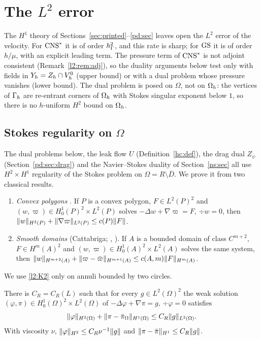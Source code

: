 \section{The \texorpdfstring{$L^2$}{L2} error}\label{l2:sec}

The $H^1$ theory of Sections~\ref{sec:printed}--\ref{pd:sec} leaves open the $L^2$ error of the velocity. For $\mathrm{CNS}^\ast$ it is of order $h_\Gamma^2$, and this rate is sharp; for $\mathrm{GS}$ it is of order $h/\mu$, with an explicit leading term. The pressure term of $\mathrm{CNS}^\ast$ is not adjoint consistent (Remark~\ref{l2:rem:adj}), so the duality arguments below test only with fields in $Y_h=Z_h\cap V_h^0$ (upper bound) or with a dual problem whose pressure vanishes (lower bound). The dual problem is posed on $\Omega$, not on $\Omega_h$: the vertices of $\Gamma_h$ are re-entrant corners of $\Omega_h$ with Stokes singular exponent below $1$, so there is no $h$-uniform $H^2$ bound on $\Omega_h$.

\subsection{Stokes regularity on $\Omega$}\label{l2:sec:R}

The dual problems below, the leak flow $U$ (Definition~\ref{hc:def}), the drag dual $Z_\psi$ (Section~\ref{pd:sec:drag}) and the Navier--Stokes duality of Section~\ref{ns:sec} all use $H^2\times H^1$ regularity of the Stokes problem on $\Omega=R\setminus\overline D$. We prove it from two classical results.
\begin{enumerate}[label=(K\arabic*)]
\item\label{l2:K1} \emph{Convex polygons} \cite[Theorem~2]{KelloggOsborn1976}. If $P$ is a convex polygon, $F\in L^2(P)^2$ and $(w,\varpi)\in H^1_0(P)^2\times L^2(P)$ solves $-\Delta w+\nabla\varpi=F$, $\div w=0$, then $\lVert w\rVert_{H^2(P)}+\lVert \nabla\varpi\rVert_{L^2(P)}\le c(P)\lVert F\rVert$.
\item\label{l2:K2} \emph{Smooth domains} (Cattabriga; \cite[Ch.~I, Prop.~2.2]{Temam}, \cite[Thm.~IV.6.1]{Galdi}). If $A$ is a bounded domain of class $C^{m+2}$, $F\in H^m(A)^2$ and $(w,\varpi)\in H^1_0(A)^2\times L^2(A)$ solves the same system, then $\lVert w\rVert_{H^{m+2}(A)}+\lVert \varpi-\bar\varpi\rVert_{H^{m+1}(A)}\le c(A,m)\lVert F\rVert_{H^m(A)}$. %
\end{enumerate}
We use \ref{l2:K2} only on annuli bounded by two circles.

\begin{theorem}\label{l2:thm:R}
There is $C_R=C_R(L)$ such that for every $g\in L^2(\Omega)^2$ the weak solution $(\varphi,\pi)\in H^1_0(\Omega)^2\times L^2(\Omega)$ of $-\Delta\varphi+\nabla\pi=g$, $\div\varphi=0$ satisfies
\[
\lVert \varphi\rVert_{H^2(\Omega)}+\lVert \pi-\bar\pi_\Omega\rVert_{H^1(\Omega)}\le C_R\lVert g\rVert_{L^2(\Omega)} .
\]
With viscosity $\nu$, $\lVert \varphi\rVert_{H^2}\le C_R\nu^{-1}\lVert g\rVert$ and $\lVert \pi-\bar\pi\rVert_{H^1}\le C_R\lVert g\rVert$.
\end{theorem}

